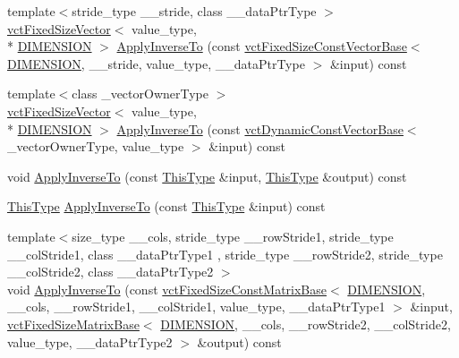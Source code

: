 \begin{DoxyCompactItemize}
\item 
{\footnotesize template$<$stride\-\_\-type \-\_\-\-\_\-stride, class \-\_\-\-\_\-data\-Ptr\-Type $>$ }\\\hyperlink{classvct_fixed_size_vector}{vct\-Fixed\-Size\-Vector}$<$ value\-\_\-type, \\*
\hyperlink{classvct_frame_base_a4284a4e875533c13df90a20c0233e043ad25b85efd5e4c2687ddf38ae18cd88f0}{D\-I\-M\-E\-N\-S\-I\-O\-N} $>$ \hyperlink{classvct_frame_base_a44d31464805db9f669600d412154e91e}{Apply\-Inverse\-To} (const \hyperlink{classvct_fixed_size_const_vector_base}{vct\-Fixed\-Size\-Const\-Vector\-Base}$<$ \hyperlink{classvct_frame_base_a4284a4e875533c13df90a20c0233e043ad25b85efd5e4c2687ddf38ae18cd88f0}{D\-I\-M\-E\-N\-S\-I\-O\-N}, \-\_\-\-\_\-stride, value\-\_\-type, \-\_\-\-\_\-data\-Ptr\-Type $>$ \&input) const 
\item 
{\footnotesize template$<$class \-\_\-vector\-Owner\-Type $>$ }\\\hyperlink{classvct_fixed_size_vector}{vct\-Fixed\-Size\-Vector}$<$ value\-\_\-type, \\*
\hyperlink{classvct_frame_base_a4284a4e875533c13df90a20c0233e043ad25b85efd5e4c2687ddf38ae18cd88f0}{D\-I\-M\-E\-N\-S\-I\-O\-N} $>$ \hyperlink{classvct_frame_base_a2ffc89a6a4e34d229f95cf452c2254d2}{Apply\-Inverse\-To} (const \hyperlink{classvct_dynamic_const_vector_base}{vct\-Dynamic\-Const\-Vector\-Base}$<$ \-\_\-vector\-Owner\-Type, value\-\_\-type $>$ \&input) const 
\item 
void \hyperlink{classvct_frame_base_a02f7ea3175a0b3b10afcfdb410246f9d}{Apply\-Inverse\-To} (const \hyperlink{classvct_frame_base_a076f1fe4fc957faa0d1ff7450d1cb768}{This\-Type} \&input, \hyperlink{classvct_frame_base_a076f1fe4fc957faa0d1ff7450d1cb768}{This\-Type} \&output) const 
\item 
\hyperlink{classvct_frame_base_a076f1fe4fc957faa0d1ff7450d1cb768}{This\-Type} \hyperlink{classvct_frame_base_a907aab0c6eca388f17777aca5a54ef45}{Apply\-Inverse\-To} (const \hyperlink{classvct_frame_base_a076f1fe4fc957faa0d1ff7450d1cb768}{This\-Type} \&input) const 
\item 
{\footnotesize template$<$size\-\_\-type \-\_\-\-\_\-cols, stride\-\_\-type \-\_\-\-\_\-row\-Stride1, stride\-\_\-type \-\_\-\-\_\-col\-Stride1, class \-\_\-\-\_\-data\-Ptr\-Type1 , stride\-\_\-type \-\_\-\-\_\-row\-Stride2, stride\-\_\-type \-\_\-\-\_\-col\-Stride2, class \-\_\-\-\_\-data\-Ptr\-Type2 $>$ }\\void \hyperlink{classvct_frame_base_ab17c241813dac96239995cacfbd9c9a2}{Apply\-Inverse\-To} (const \hyperlink{classvct_fixed_size_const_matrix_base}{vct\-Fixed\-Size\-Const\-Matrix\-Base}$<$ \hyperlink{classvct_frame_base_a4284a4e875533c13df90a20c0233e043ad25b85efd5e4c2687ddf38ae18cd88f0}{D\-I\-M\-E\-N\-S\-I\-O\-N}, \-\_\-\-\_\-cols, \-\_\-\-\_\-row\-Stride1, \-\_\-\-\_\-col\-Stride1, value\-\_\-type, \-\_\-\-\_\-data\-Ptr\-Type1 $>$ \&input, \hyperlink{classvct_fixed_size_matrix_base}{vct\-Fixed\-Size\-Matrix\-Base}$<$ \hyperlink{classvct_frame_base_a4284a4e875533c13df90a20c0233e043ad25b85efd5e4c2687ddf38ae18cd88f0}{D\-I\-M\-E\-N\-S\-I\-O\-N}, \-\_\-\-\_\-cols, \-\_\-\-\_\-row\-Stride2, \-\_\-\-\_\-col\-Stride2, value\-\_\-type, \-\_\-\-\_\-data\-Ptr\-Type2 $>$ \&output) const 

\end{DoxyCompactItemize}
